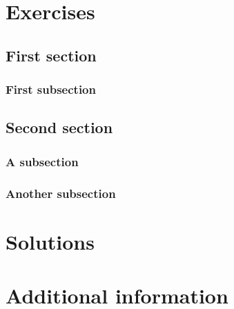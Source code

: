 \documentclass[oneside]{book}
\begin{document}
\chapter{Exercises}

\section{First section}

\subsection{First subsection}

\section{Second section}

\subsection{A subsection}

\subsection{Another subsection}

\chapter{Solutions}

\chapter{Additional information}
\end{document}
